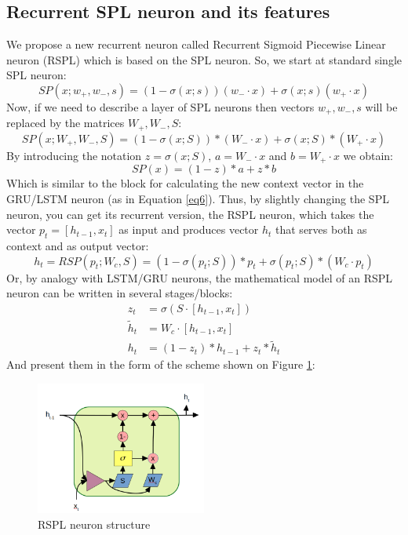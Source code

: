 \documentclass[sn-apa]{sn-jnl}%
\begin{document}
\subsection{Recurrent SPL neuron and its features}\label{subsec53}
We propose a new recurrent neuron called Recurrent Sigmoid Piecewise Linear neuron (RSPL) which is based on the SPL neuron. So, we start at standard single SPL neuron:
\begin{equation}
SP(x;w_+,w_-,s) = (1 - \sigma(x;s))(w_- \cdot x) + \sigma(x;s)(w_+ \cdot x) \label{eq18}
\end{equation}
Now, if we need to describe a layer of SPL neurons then vectors $w_+,w_-,s$ will be replaced by the matrices  $W_+,W_-,S$:
\begin{equation}
SP(x;W_+,W_-, S) = (1 - \sigma(x;S)) * (W_- \cdot x) + \sigma(x;S) * (W_+ \cdot x) \label{eq19}
\end{equation}
By introducing the notation $ z = \sigma(x;S) $, $a = W_- \cdot x$  and $b = W_+ \cdot x$ we obtain:
\begin{equation}
SP(x) = (1 - z) * a + z * b \label{eq20}
\end{equation}
Which is similar to the block for calculating the new context vector in the GRU/LSTM neuron (as in Equation \ref{eq6}). Thus, by slightly changing the SPL neuron, you can get its recurrent version, the RSPL neuron, which takes the vector $p_t=[h_{t-1}, x_t]$ as input and produces vector $h_t$ that serves both as context and as output vector:
\begin{equation}
h_t=RSP(p_t;W_c,S) = (1-\sigma(p_t;S))*p_t + \sigma(p_t;S)*(W_c \cdot p_t) \label{eq21}
\end{equation}
Or, by analogy with LSTM/GRU neurons, the mathematical model of an RSPL neuron can be written in several stages/blocks:
\begin{align}
z_t &= \sigma(S \cdot [h_{t-1}, x_t]) \nonumber \\
\tilde{h}_t &= W_c \cdot [h_{t-1}, x_t] \nonumber \\
h_t &= (1 - z_t) * h_{t-1} + z_t * \tilde{h}_t \label{eq22}
\end{align}
And present them in the form of the scheme shown on Figure \ref{fig7}:

\begin{figure}[H]
\centering
\includegraphics[width=0.5\textwidth]{Fig7.png}
\caption{RSPL neuron structure}\label{fig7}
\end{figure}
\end{document}
